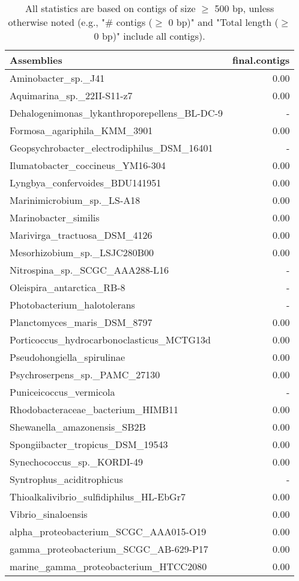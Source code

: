 \documentclass[12pt,a4paper]{article}
\begin{document}
\begin{table}[ht]
\begin{center}
\caption{All statistics are based on contigs of size $\geq$ 500 bp, unless otherwise noted (e.g., "\# contigs ($\geq$ 0 bp)" and "Total length ($\geq$ 0 bp)" include all contigs).}
\begin{tabular}{|l*{1}{|r}|}
\hline
Assemblies & final.contigs \\ \hline
Aminobacter\_sp.\_J41 & 0.00 \\ \hline
Aquimarina\_sp.\_22II-S11-z7 & 0.00 \\ \hline
Dehalogenimonas\_lykanthroporepellens\_BL-DC-9 & - \\ \hline
Formosa\_agariphila\_KMM\_3901 & 0.00 \\ \hline
Geopsychrobacter\_electrodiphilus\_DSM\_16401 & - \\ \hline
Ilumatobacter\_coccineus\_YM16-304 & 0.00 \\ \hline
Lyngbya\_confervoides\_BDU141951 & 0.00 \\ \hline
Marinimicrobium\_sp.\_LS-A18 & 0.00 \\ \hline
Marinobacter\_similis & 0.00 \\ \hline
Marivirga\_tractuosa\_DSM\_4126 & 0.00 \\ \hline
Mesorhizobium\_sp.\_LSJC280B00 & 0.00 \\ \hline
Nitrospina\_sp.\_SCGC\_AAA288-L16 & - \\ \hline
Oleispira\_antarctica\_RB-8 & - \\ \hline
Photobacterium\_halotolerans & - \\ \hline
Planctomyces\_maris\_DSM\_8797 & 0.00 \\ \hline
Porticoccus\_hydrocarbonoclasticus\_MCTG13d & 0.00 \\ \hline
Pseudohongiella\_spirulinae & 0.00 \\ \hline
Psychroserpens\_sp.\_PAMC\_27130 & 0.00 \\ \hline
Puniceicoccus\_vermicola & - \\ \hline
Rhodobacteraceae\_bacterium\_HIMB11 & 0.00 \\ \hline
Shewanella\_amazonensis\_SB2B & 0.00 \\ \hline
Spongiibacter\_tropicus\_DSM\_19543 & 0.00 \\ \hline
Synechococcus\_sp.\_KORDI-49 & 0.00 \\ \hline
Syntrophus\_aciditrophicus & - \\ \hline
Thioalkalivibrio\_sulfidiphilus\_HL-EbGr7 & 0.00 \\ \hline
Vibrio\_sinaloensis & 0.00 \\ \hline
alpha\_proteobacterium\_SCGC\_AAA015-O19 & 0.00 \\ \hline
gamma\_proteobacterium\_SCGC\_AB-629-P17 & 0.00 \\ \hline
marine\_gamma\_proteobacterium\_HTCC2080 & 0.00 \\ \hline
\end{tabular}
\end{center}
\end{table}
\end{document}
